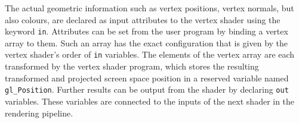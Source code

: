 The actual geometric information such as vertex positions, vertex normals, but also colours, are declared as
input attributes to the vertex shader using the keyword \lstinline[language=C]|in|.
Attributes can be set from the user program by binding a vertex array to them. 
Such an array has the exact configuration that is given by the vertex shader's order of \lstinline[language=C]|in| variables.
The elements of the vertex array are each transformed by the vertex shader program, which stores the resulting 
transformed and projected screen space position in a reserved variable named \lstinline[language=C]|gl_Position|.
Further results can be output from the shader by declaring \lstinline[language=C]|out| variables.
These variables are connected to the inputs of the next shader in the rendering pipeline.
